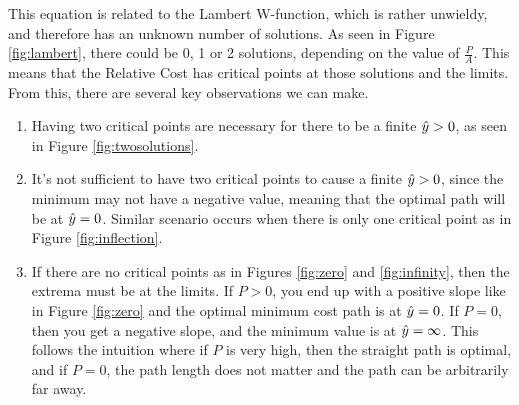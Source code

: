 This equation is related to the Lambert W-function, which is rather unwieldy, and therefore has an unknown number of solutions. As seen in Figure \ref{fig:lambert}, there could be 0, 1 or 2 solutions, depending on the value of $\frac{P}{A}$. This means that the Relative Cost has critical points at those solutions and the limits. From this, there are several key observations we can make. 
\begin{enumerate}
\item Having two critical points are necessary for there to be a finite $\hat{y}>0$, as seen in Figure \ref{fig:twosolutions}. 
\item It's not sufficient to have two critical points to cause a finite $\hat{y}>0$, since the minimum may not have a negative value, meaning that the optimal path will be at $\hat{y}=0$. Similar scenario occurs when there is only one critical point as in Figure \ref{fig:inflection}. 
\item If there are no critical points as in Figures \ref{fig:zero} and \ref{fig:infinity}, then the extrema must be at the limits. If $P>0$, you end up with a positive slope like in Figure \ref{fig:zero} and the optimal minimum cost path is at $\hat{y}=0$. If $P=0$, then you get a negative slope, and the minimum value is at $\hat{y}=\infty$. This follows the intuition where if $P$ is very high, then the straight path is optimal, and if $P=0$, the path length does not matter and the path can be arbitrarily far away. 
\end{enumerate}

